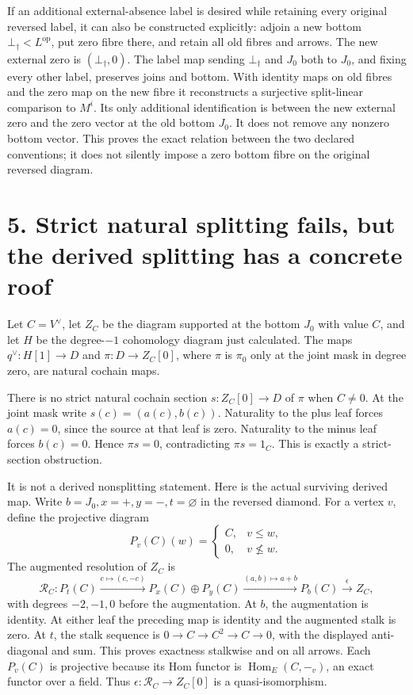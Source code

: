 If an additional external-absence label is desired while retaining every
original reversed label, it can also be constructed explicitly: adjoin a
new bottom \(\bot_\dagger<L^{\mathrm{op}}\), put zero fibre there, and
retain all old fibres and arrows. The new external zero is
\((\bot_\dagger,0)\). The label map sending \(\bot_\dagger\) and \(J_0\)
both to \(J_0\), and fixing every other label, preserves joins and
bottom. With identity maps on old fibres and the zero map on the new
fibre it reconstructs a surjective split-linear comparison to \(M^i\).
Its only additional identification is between the new external zero and
the zero vector at the old bottom \(J_0\). It does not remove any
nonzero bottom vector. This proves the exact relation between the two
declared conventions; it does not silently impose a zero bottom fibre on
the original reversed diagram.

\section{5. Strict natural splitting fails, but the derived splitting
has a concrete
roof}\label{strict-natural-splitting-fails-but-the-derived-splitting-has-a-concrete-roof}

Let \(C=V^\vee\), let \(Z_C\) be the diagram supported at the bottom
\(J_0\) with value \(C\), and let \(H\) be the degree-\(-1\) cohomology
diagram just calculated. The maps \(q^\vee:H[1]\to D\) and
\(\pi:D\to Z_C[0]\), where \(\pi\) is \(\pi_0\) only at the joint mask
in degree zero, are natural cochain maps.

There is no strict natural cochain section \(s:Z_C[0]\to D\) of \(\pi\)
when \(C\ne0\). At the joint mask write \(s(c)=(a(c),b(c))\). Naturality
to the plus leaf forces \(a(c)=0\), since the source at that leaf is
zero. Naturality to the minus leaf forces \(b(c)=0\). Hence \(\pi s=0\),
contradicting \(\pi s=1_C\). This is exactly a strict-section
obstruction.

It is not a derived nonsplitting statement. Here is the actual surviving
derived map. Write \(b=J_0,x=+,y=-,t=\varnothing\) in the reversed
diamond. For a vertex \(v\), define the projective diagram \[
P_v(C)(w)=\begin{cases}C,&v\le w,\\0,&v\nleq w.\end{cases}
\] The augmented resolution of \(Z_C\) is \[
\mathcal R_C:
P_t(C)\xrightarrow{c\mapsto(c,-c)}
P_x(C)\oplus P_y(C)\xrightarrow{(a,b)\mapsto a+b}
P_b(C)\xrightarrow{\epsilon}Z_C,
\] with degrees \(-2,-1,0\) before the augmentation. At \(b\), the
augmentation is identity. At either leaf the preceding map is identity
and the augmented stalk is zero. At \(t\), the stalk sequence is
\(0\to C\to C^2\to C\to0\), with the displayed anti-diagonal and sum.
This proves exactness stalkwise and on all arrows. Each \(P_v(C)\) is
projective because its Hom functor is \(\operatorname{Hom}_E(C,-_v)\),
an exact functor over a field. Thus \(\epsilon:\mathcal R_C\to Z_C[0]\)
is a quasi-isomorphism.

